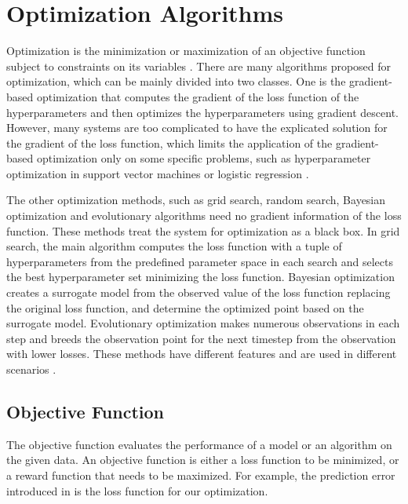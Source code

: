 \FloatBarrier

\section{Optimization Algorithms}

Optimization is the minimization or maximization of an objective function subject to constraints on its variables \cite{nocedal2006numerical}. There are many algorithms proposed for optimization, which can be mainly divided into two classes. One is the gradient-based optimization that computes the gradient of the loss function of the hyperparameters and then optimizes the hyperparameters using gradient descent. However, many systems are too complicated to have the explicated solution for the gradient of the loss function, which limits the application of the gradient-based optimization only on some specific problems, such as hyperparameter optimization in support vector machines \cite{chapelle2002choosing} or logistic regression \cite{foo2008efficient}. 

The other optimization methods, such as grid search, random search, Bayesian optimization and evolutionary algorithms need no gradient information of the loss function. These methods treat the system for optimization as a black box. In grid search, the main algorithm computes the loss function with a tuple of hyperparameters from the predefined parameter space in each search and selects the best hyperparameter set minimizing the loss function. Bayesian optimization creates a surrogate model from the observed value of the loss function replacing the original loss function, and determine the optimized point based on the surrogate model. Evolutionary optimization makes numerous observations in each step and breeds the observation point for the next timestep from the observation with lower losses. These methods have different features and are used in different scenarios \cite{claesen2015hyperparameter}\cite{feurer2019hyperparameter}.


\subsection{Objective Function}

The objective function evaluates the performance of a model or an algorithm on the given data. An objective function is either a loss function to be minimized, or a reward function that needs to be maximized. For example, the prediction error introduced in  is the loss function for our optimization.

